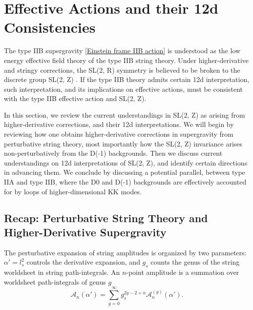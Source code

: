 \section{Effective Actions and their 12d Consistencies}
The type IIB supergravity \eqref{Einstein frame IIB action} is understood as the low energy effective field theory of the type IIB string theory.
Under higher-derivative and stringy corrections, the SL(2, R) symmetry is believed to be broken to the discrete group SL(2, Z) \cite{Schwarz:1995dk}.
If the type IIB theory admits certain 12d interpretation, such interpretation, and its implications on effective actions, must be consistent with the type IIB effective action and SL(2, Z).

In this section, we review the current understandings in SL(2, Z) as arising from higher-derivative corrections, and their 12d interpretations.
We will begin by reviewing how one obtains higher-derivative corrections in supergravity from perturbative string theory, most importantly how the SL(2, Z) invariance arises non-perturbatively from the D(-1) backgrounds.
Then we discuss current understandings on 12d interpretations of SL(2, Z), and identify certain directions in advancing them. 
We conclude by discussing a potential parallel, between type IIA and type IIB, where the D0 and D(-1) backgrounds are effectively accounted for by loops of higher-dimensional KK modes.

\subsection{Recap: Perturbative String Theory and Higher-Derivative Supergravity}
{\color{orange}
The perturbative expansion of string amplitudes is organized by two parameters: $\alpha' = l_s^2$ controls the derivative expansion, and $g_s$ counts the genus of the string worldsheet in string path-integrals.
An $n$-point amplitude is a summation over worldsheet path-integrals of genus $g$
\begin{equation}
    \mathcal A_n(\alpha') = \sum_{g=0}^\infty g_s^{2g-2+n} \mathcal A_n^{(g)}(\alpha').
\end{equation}
}



